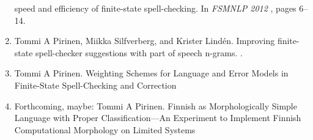 \documentclass[officiallayout]{unihelcompling}
\begin{document}
\begin{enumerate}
        speed and efficiency of finite-state spell-checking.
        \newblock In {\em FSMNLP 2012\/} \citep{fsmnlp2012}, pages 6--14.
    \item \citep{pirinen2012improving}
        Tommi A Pirinen, Miikka Silfverberg, and Krister Lind\'{e}n.
        \newblock Improving finite-state spell-checker suggestions with part of
        speech n-grams.
        .
    \item \citep{pirinen2013quality}
        Tommi A Pirinen.
        \newblock Weighting Schemes for Language and Error Models in
        Finite-State Spell-Checking and Correction
    \item Forthcoming, maybe:
        Tommi A Pirinen.
        \newblock Finnish as Morphologically Simple Language with Proper
        Classification---An Experiment to Implement Finnish Computational
        Morphology on Limited Systems
\end{enumerate}
\end{document}
